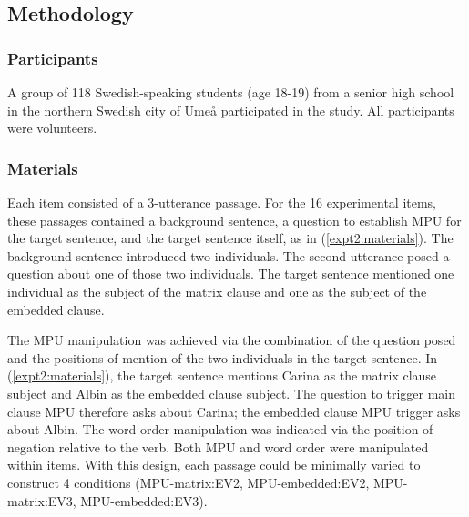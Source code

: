 \documentclass[output=paper]{LSP/langsci}
\begin{document}
\subsection{Methodology}

\subsubsection*{Participants}

A group of 118 Swedish-speaking students (age 18-19) from a senior high school in the northern Swedish city of Ume{\aa} participated in the study. All participants were volunteers.

\subsubsection*{Materials}

Each item consisted of a 3-utterance passage.  For the 16 experimental items, these passages contained a background sentence, a question to establish MPU for the target sentence, and the target sentence itself, as in (\ref{expt2:materials}).  The background sentence introduced two individuals. The second utterance posed a question about one of those two individuals.  The target sentence mentioned one individual as the subject of the matrix clause and one as the subject of the embedded clause.  

The MPU manipulation was achieved via the combination of the question posed and the positions of mention of the two individuals in the target sentence.  In (\ref{expt2:materials}), the target sentence mentions Carina as the matrix clause subject and Albin as the embedded clause subject.  The question to trigger main clause MPU therefore asks about Carina; the embedded clause MPU trigger asks about Albin.  The word order manipulation was indicated via the position of negation relative to the verb.  Both MPU and word order were manipulated within items.  With this design, each passage could be minimally varied to construct 4 conditions (MPU-matrix:EV2, MPU-embedded:EV2, MPU-matrix:EV3, MPU-embedded:EV3).  
\end{document}

